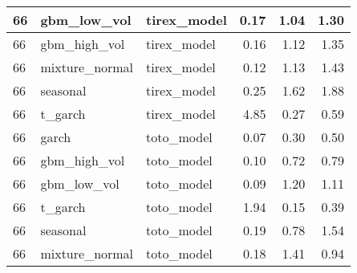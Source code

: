 {\begin{tabular}{lllrrr}
\midrule
66 & gbm\_low\_vol & tirex\_model & 0.17 & 1.04 & 1.30 \\
\midrule
66 & gbm\_high\_vol & tirex\_model & 0.16 & 1.12 & 1.35 \\
\midrule
66 & mixture\_normal & tirex\_model & 0.12 & 1.13 & 1.43 \\
\midrule
66 & seasonal & tirex\_model & 0.25 & 1.62 & 1.88 \\
\midrule
66 & t\_garch & tirex\_model & 4.85 & 0.27 & 0.59 \\
\midrule
66 & garch & toto\_model & 0.07 & 0.30 & 0.50 \\
\midrule
66 & gbm\_high\_vol & toto\_model & 0.10 & 0.72 & 0.79 \\
\midrule
66 & gbm\_low\_vol & toto\_model & 0.09 & 1.20 & 1.11 \\
\midrule
66 & t\_garch & toto\_model & 1.94 & 0.15 & 0.39 \\
\midrule
66 & seasonal & toto\_model & 0.19 & 0.78 & 1.54 \\
\midrule
66 & mixture\_normal & toto\_model & 0.18 & 1.41 & 0.94 \\
\bottomrule
\end{tabular}
}
